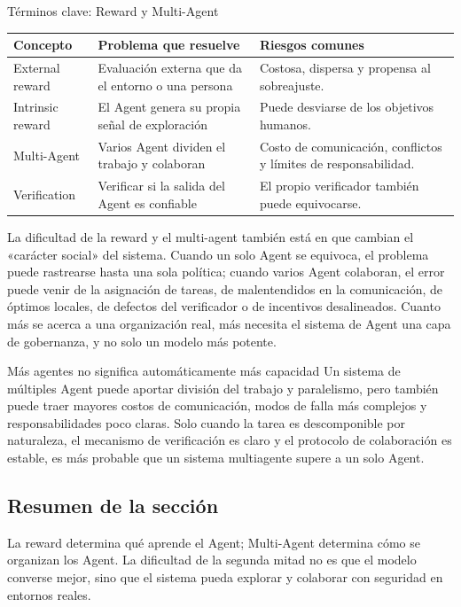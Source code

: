 \begin{knowledgebox}{Términos clave: Reward y Multi-Agent}
\begin{tabularx}{\textwidth}{p{}p{}X}
\toprule
Concepto & Problema que resuelve & Riesgos comunes \\
\midrule
External reward & Evaluación externa que da el entorno o una persona & Costosa, dispersa y propensa al sobreajuste. \\
Intrinsic reward & El Agent genera su propia señal de exploración & Puede desviarse de los objetivos humanos. \\
Multi-Agent & Varios Agent dividen el trabajo y colaboran & Costo de comunicación, conflictos y límites de responsabilidad. \\
Verification & Verificar si la salida del Agent es confiable & El propio verificador también puede equivocarse. \\
\bottomrule
\end{tabularx}
\end{knowledgebox}

La dificultad de la reward y el multi-agent también está en que cambian el «carácter social» del sistema. Cuando un solo Agent se equivoca, el problema puede rastrearse hasta una sola política; cuando varios Agent colaboran, el error puede venir de la asignación de tareas, de malentendidos en la comunicación, de óptimos locales, de defectos del verificador o de incentivos desalineados. Cuanto más se acerca a una organización real, más necesita el sistema de Agent una capa de gobernanza, y no solo un modelo más potente.

\begin{warningbox}{Más agentes no significa automáticamente más capacidad}
Un sistema de múltiples Agent puede aportar división del trabajo y paralelismo, pero también puede traer mayores costos de comunicación, modos de falla más complejos y responsabilidades poco claras. Solo cuando la tarea es descomponible por naturaleza, el mecanismo de verificación es claro y el protocolo de colaboración es estable, es más probable que un sistema multiagente supere a un solo Agent.
\end{warningbox}

\subsection{Resumen de la sección}

La reward determina qué aprende el Agent; Multi-Agent determina cómo se organizan los Agent. La dificultad de la segunda mitad no es que el modelo converse mejor, sino que el sistema pueda explorar y colaborar con seguridad en entornos reales.
